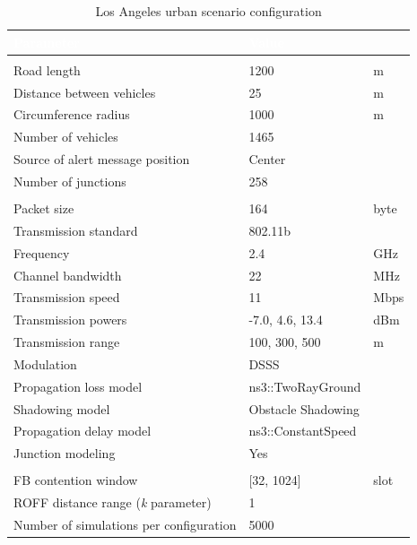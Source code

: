 		\begin{table}[H]
			\def\arraystretch{1.1}
			\begin{tabularx}{\textwidth}{l | l  l}
				\rowcolor{I} {\large \textcolor{white}{Parameter}} & {\large \textcolor{white}{Value}} & {\large \textcolor{white}{}} \TBstrut  \\
				\toprule
				\endhead
				\rowcolor{P} \multicolumn{3}{c}{Scenario configuration} \\
				\midrule[1pt]
				Road length 							& 1200	 				& m		\\
				Distance between vehicles 				& 25					& m		\\
				Circumference radius					& 1000					& m		\\
				Number of vehicles						& 1465					& 		\\
				Source of alert message position		& Center				&		\\
				Number of junctions						& 258					&		\\	
				\midrule[1pt]
				\rowcolor{P} \multicolumn{3}{c}{Network configuration} \\
				\midrule[1pt]
				Packet size								& 164					& byte	\\	
				Transmission standard					& 802.11b				&		\\
				Frequency								& 2.4					& GHz	\\
				Channel bandwidth						& 22					& MHz	\\
				Transmission speed						& 11					& Mbps	\\
				Transmission powers						& -7.0, 4.6, 13.4		& dBm	\\
				Transmission range						& 100, 300, 500			& m		\\
				Modulation								& DSSS					& 		\\
				Propagation loss model					& ns3::TwoRayGround 	&		\\
				Shadowing model							& Obstacle Shadowing 	&		\\
				Propagation delay model					& ns3::ConstantSpeed	&		\\
				Junction modeling						& Yes					&		\\
				\midrule[1pt]
				\rowcolor{P} \multicolumn{3}{c}{Protocols configuration} \\
				\midrule[1pt]
				FB contention window					& [32, 1024]			& slot	\\
				ROFF distance range (\textit{k} parameter) & 1					&		\\	
				\midrule[1pt]
				Number of simulations per configuration	& 5000					&		\\
				\bottomrule
			\end{tabularx}
			\caption{Los Angeles urban scenario configuration}
			\label{tab:la-25}
		\end{table}
	
